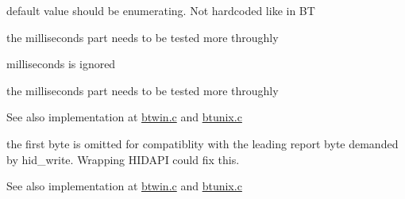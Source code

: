 \begin{DoxyRefList}
default value should be enumerating. Not hardcoded like in {\ttfamily B\+T}  
\item[\label{bug__bug000006}%
\hypertarget{bug__bug000006}{}%
global\+Scope$>$ Global \hyperlink{btunix_8c_a0100d3e3520a9b774896f6b2a2f589f5}{bt\+\_\+read} (void $\ast$fd\+\_\+, u8 $\ast$buf, size\+\_\+t count, int milliseconds)]the milliseconds part needs to be tested more throughly  
\item[\label{bug__bug000010}%
\hypertarget{bug__bug000010}{}%
global\+Scope$>$ Global \hyperlink{btwin_8c_a5861a216864bb97223f98e631f0c667c}{bt\+\_\+read} (void $\ast$handle, u8 $\ast$buf, size\+\_\+t count, int milliseconds)]milliseconds is ignored  
\item[\label{bug__bug000002}%
\hypertarget{bug__bug000002}{}%
global\+Scope$>$ Global \hyperlink{btserial_8h_a1b964cfcb627fd4cda8298d8f2d9f0d3}{bt\+\_\+read} (void $\ast$device, u8 $\ast$buf, size\+\_\+t count, int milliseconds)]the milliseconds part needs to be tested more throughly \begin{DoxySeeAlso}{See also}
implementation at \hyperlink{btwin_8c}{btwin.\+c} and \hyperlink{btunix_8c}{btunix.\+c}  
\end{DoxySeeAlso}

\item[\label{bug__bug000001}%
\hypertarget{bug__bug000001}{}%
global\+Scope$>$ Global \hyperlink{btserial_8h_ac9b25cd932b8c5a842d1cd96e22fd200}{bt\+\_\+write} (void $\ast$device, const u8 $\ast$buf, size\+\_\+t count)]the first byte is omitted for compatiblity with the leading report byte demanded by {\ttfamily hid\+\_\+write}. Wrapping H\+I\+D\+A\+P\+I could fix this. \begin{DoxySeeAlso}{See also}
implementation at \hyperlink{btwin_8c}{btwin.\+c} and \hyperlink{btunix_8c}{btunix.\+c}  
\end{DoxySeeAlso}


\end{DoxyRefList}
